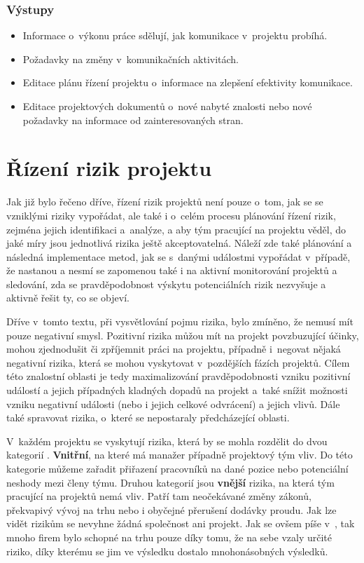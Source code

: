 \subsubsection*{Výstupy}
\begin{itemize}
    \item Informace o~výkonu práce sdělují, jak komunikace v~projektu probíhá.
    \item Požadavky na změny v~komunikačních aktivitách.
    \item Editace plánu řízení projektu o~informace na zlepšení efektivity komunikace.
    \item Editace projektových dokumentů o~nové nabyté znalosti nebo nové požadavky na informace od zainteresovaných stran.
\end{itemize}

\section{Řízení rizik projektu}
\label{rizikaSection}

Jak již bylo řečeno dříve, řízení rizik projektů není pouze o~tom, jak se se vzniklými riziky vypořádat, ale také i o~celém procesu plánování řízení rizik, zejména jejich identifikaci a~analýze, a aby tým pracující na projektu věděl, do jaké míry jsou jednotlivá rizika ještě akceptovatelná. Náleží zde také plánování a následná implementace metod, jak se s~danými událostmi vypořádat v~případě, že nastanou a nesmí se zapomenou také i na aktivní monitorování projektů a sledování, zda se pravděpodobnost výskytu potenciálních rizik nezvyšuje a aktivně řešit ty, co se objeví.

Dříve v~tomto textu, při vysvětlování pojmu rizika, bylo zmíněno, že nemusí mít pouze negativní smysl. Pozitivní rizika můžou mít na projekt povzbuzující účinky, mohou zjednodušit či zpříjemnit práci na projektu, případně i~negovat nějaká negativní rizika, která se mohou vyskytovat v~pozdějších fázích projektů. Cílem této znalostní oblasti je tedy maximalizování pravděpodobnosti vzniku pozitivní událostí a jejich případných kladných dopadů na projekt a~také snížit možnosti vzniku negativní události (nebo i jejich celkové odvrácení) a jejich vlivů. Dále také spravovat rizika, o~které se nepostaraly předcházející oblasti.

V~každém projektu se vyskytují rizika, která by se mohla rozdělit do dvou kategorií \cite{MPRRiziko}. \textbf{Vnitřní}, na které má manažer případně projektový tým vliv. Do této kategorie můžeme zařadit přiřazení pracovníků na dané pozice nebo potenciální neshody mezi členy týmu. Druhou kategorií jsou \textbf{vnější} rizika, na která tým pracující na projektů nemá vliv. Patří tam neočekávané změny zákonů, překvapivý vývoj na trhu nebo i obyčejné přerušení dodávky proudu. Jak lze vidět rizikům se nevyhne žádná společnost ani projekt. Jak se ovšem píše v~\cite{StrategieRizeni}, tak mnoho firem bylo schopné na trhu pouze díky tomu, že na sebe vzaly určité riziko, díky kterému se jim ve výsledku dostalo mnohonásobných výsledků.

